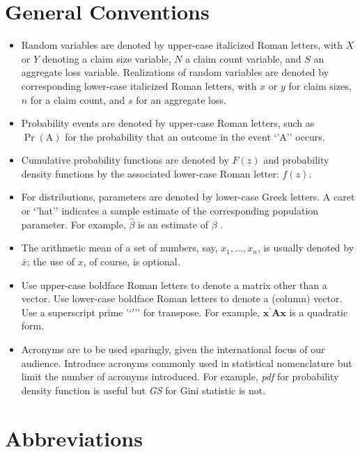 \documentclass[
]{book}
\providecommand{\tightlist}{%
  \setlength{\itemsep}{0pt}\setlength{\parskip}{0pt}}
\begin{document}
\hypertarget{S:General}{%
\section{General Conventions}\label{S:General}}

\begin{itemize}
\tightlist
\item
  Random variables are denoted by upper-case italicized Roman letters, with \(X\) or \(Y\) denoting a claim size variable, \(N\) a claim count variable, and \(S\) an aggregate loss variable. Realizations of random variables are denoted by corresponding lower-case italicized Roman letters, with \(x\) or \(y\) for claim sizes, \(n\) for a claim count, and \(s\) for an aggregate loss.
\item
  Probability events are denoted by upper-case Roman letters, such as \(\Pr(\mathrm{A})\) for the probability that an outcome in the event `'A'' occurs.
\item
  Cumulative probability functions are denoted by \(F(z)\) and probability density functions by the associated lower-case Roman letter: \(f(z)\).
\item
  For distributions, parameters are denoted by lower-case Greek letters. A caret or `'hat'' indicates a sample estimate of the corresponding population parameter. For example, \(\hat{\beta}\) is an estimate of \(\beta\) .
\item
  The arithmetic mean of a set of numbers, say, \(x_1, \ldots, x_n\), is usually denoted by \(\bar{x}\); the use of \(x\), of course, is optional.
\item
  Use upper-case boldface Roman letters to denote a matrix other than a vector. Use lower-case boldface Roman letters to denote a (column) vector. Use a superscript prime '`\(\prime\)'' for transpose. For example, \(\mathbf{x}^{\prime} \mathbf{A} \mathbf{x}\) is a quadratic form.
\item
  Acronyms are to be used sparingly, given the international focus of our audience. Introduce acronyms commonly used in statistical nomenclature but limit the number of acronyms introduced. For example, \emph{pdf} for probability density function is useful but \emph{GS} for Gini statistic is not.
\end{itemize}

\hypertarget{S:Abbreviations}{%
\section{Abbreviations}\label{S:Abbreviations}}
\end{document}

